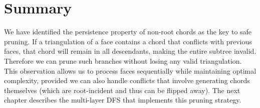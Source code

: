 \section{Summary}
\label{sec:pruning_summary}

We have identified the persistence property of non-root chords as the key to safe pruning. 
If a triangulation of a face contains a chord that conflicts with previous faces, that chord will remain in all descendants, making the entire subtree invalid. 
Therefore we can prune such branches without losing any valid triangulation. 
This observation allows us to process faces sequentially while maintaining optimal complexity, provided we can also handle conflicts that involve generating chords themselves (which are root-incident and thus can be flipped away). 
The next chapter describes the multi-layer DFS that implements this pruning strategy.